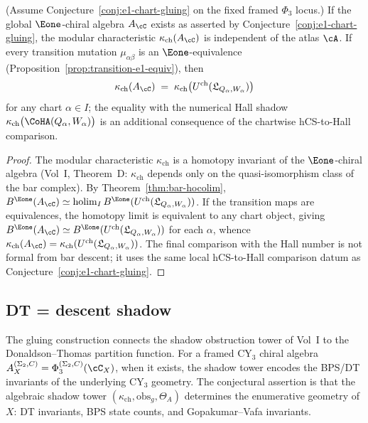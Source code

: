 \begin{corollary}
\label{cor:kappa-from-charts}
\ClaimStatusConditional
\textup{(}Assume Conjecture~\textup{\ref{conj:e1-chart-gluing}} on the fixed framed $\Phi_3$ locus.\textup{)} If the global $\Eone$-chiral algebra $A_\cC$ exists as asserted by Conjecture~\textup{\ref{conj:e1-chart-gluing}}, the modular characteristic $\kappa_{\mathrm{ch}}(A_\cC)$ is independent of the atlas $\cA$. If every transition mutation $\mu_{\alpha\beta}$ is an $\Eone$-equivalence (Proposition~\textup{\ref{prop:transition-e1-equiv}}), then
\begin{equation}
\label{eq:kappa-from-charts}
 \kappa_{\mathrm{ch}}(A_\cC) \;=\; \kappa_{\mathrm{ch}}\bigl(U^{\mathrm{ch}}(\mathfrak L_{Q_\alpha,W_\alpha})\bigr)
\end{equation}
for any chart $\alpha \in I$; the equality with the numerical Hall shadow $\kappa_{\mathrm{ch}}\bigl(\CoHA(Q_\alpha, W_\alpha)\bigr)$ is an additional consequence of the chartwise hCS-to-Hall comparison.
\end{corollary}

\begin{proof}
The modular characteristic $\kappa_{\mathrm{ch}}$ is a homotopy invariant of the $\Eone$-chiral algebra (Vol~I, Theorem~D: $\kappa_{\mathrm{ch}}$ depends only on the quasi-isomorphism class of the bar complex). By Theorem~\ref{thm:bar-hocolim}, $B^{\Eone}(A_\cC) \simeq \operatorname{holim}_I B^{\Eone}(U^{\mathrm{ch}}(\mathfrak L_{Q_\alpha,W_\alpha}))$. If the transition maps are equivalences, the homotopy limit is equivalent to any chart object, giving $B^{\Eone}(A_\cC) \simeq B^{\Eone}(U^{\mathrm{ch}}(\mathfrak L_{Q_\alpha,W_\alpha}))$ for each $\alpha$, whence $\kappa_{\mathrm{ch}}(A_\cC) = \kappa_{\mathrm{ch}}(U^{\mathrm{ch}}(\mathfrak L_{Q_\alpha,W_\alpha}))$. The final comparison with the Hall number is not formal from bar descent; it uses the same local hCS-to-Hall comparison datum as Conjecture~\ref{conj:e1-chart-gluing}.
\end{proof}


\subsection{DT = descent shadow}
\label{subsec:dt-hocolim-shadow}

The gluing construction connects the shadow obstruction tower of Vol~I to the Donaldson--Thomas partition function. For a framed CY$_3$ chiral algebra $A_X^{(\Sigma_2,C)} = \Phi_3^{(\Sigma_2,C)}(\cC_X)$, when it exists, the shadow tower encodes the BPS/DT invariants of the underlying CY$_3$ geometry. The conjectural assertion is that the algebraic shadow tower \((\kappa_{\mathrm{ch}},\mathrm{obs}_g,\Theta_A)\) determines the enumerative geometry of $X$: DT invariants, BPS state counts, and Gopakumar--Vafa invariants.

